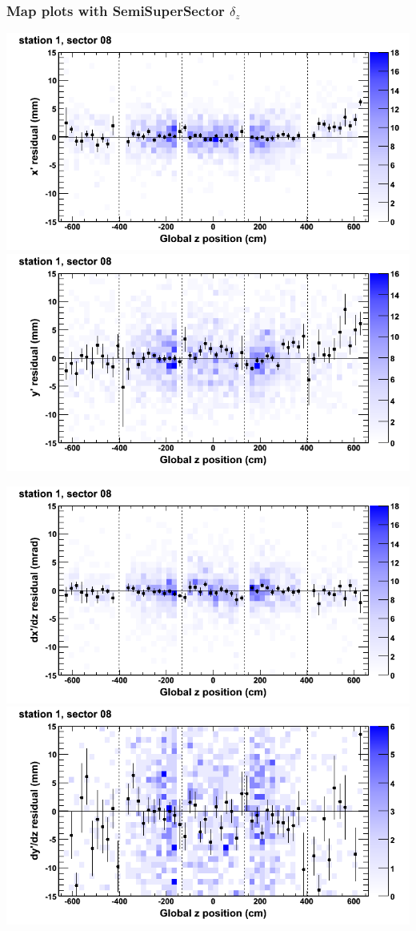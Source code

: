 \documentclass[compress]{beamer}
\begin{document}
\begin{frame}
\frametitle{Map plots with SemiSuperSector $\delta_z$}
\includegraphics[width=0.5\linewidth]{zfit_mapplots/DTvsz_st1sec08_x.png}
\includegraphics[width=0.5\linewidth]{zfit_mapplots/DTvsz_st1sec08_y.png}

\includegraphics[width=0.5\linewidth]{zfit_mapplots/DTvsz_st1sec08_dxdz.png}
\includegraphics[width=0.5\linewidth]{zfit_mapplots/DTvsz_st1sec08_dydz.png}
\end{frame}
\end{document}
